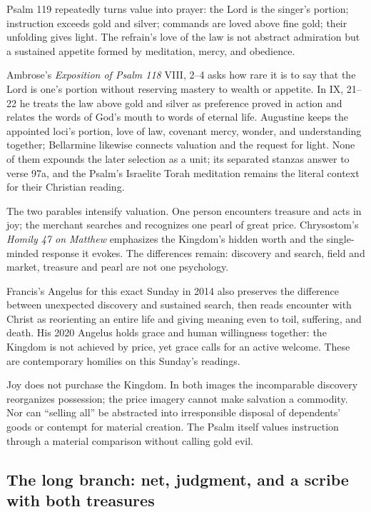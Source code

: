 Psalm 119 repeatedly turns value into prayer: the Lord is the singer's portion; instruction exceeds gold and silver; commands are loved above fine gold; their unfolding gives light. The refrain's love of the law is not abstract admiration but a sustained appetite formed by meditation, mercy, and obedience.

Ambrose's \emph{Exposition of Psalm 118} VIII, 2--4 asks how rare it is to say that the Lord is one's portion without reserving mastery to wealth or appetite. In IX, 21--22 he treats the law above gold and silver as preference proved in action and relates the words of God's mouth to words of eternal life. Augustine keeps the appointed loci's portion, love of law, covenant mercy, wonder, and understanding together; Bellarmine likewise connects valuation and the request for light. None of them expounds the later selection as a unit; its separated stanzas answer to verse 97a, and the Psalm's Israelite Torah meditation remains the literal context for their Christian reading.

The two parables intensify valuation. One person encounters treasure and acts in joy; the merchant searches and recognizes one pearl of great price. Chrysostom's \emph{Homily 47 on Matthew} emphasizes the Kingdom's hidden worth and the single-minded response it evokes. The differences remain: discovery and search, field and market, treasure and pearl are not one psychology.

Francis's Angelus for this exact Sunday in 2014 also preserves the difference between unexpected discovery and sustained search, then reads encounter with Christ as reorienting an entire life and giving meaning even to toil, suffering, and death. His 2020 Angelus holds grace and human willingness together: the Kingdom is not achieved by price, yet grace calls for an active welcome. These are contemporary homilies on this Sunday's readings.

Joy does not purchase the Kingdom. In both images the incomparable discovery reorganizes possession; the price imagery cannot make salvation a commodity. Nor can ``selling all'' be abstracted into irresponsible disposal of dependents' goods or contempt for material creation. The Psalm itself values instruction through a material comparison without calling gold evil.

\sectionguard
\subsection*{The long branch: net, judgment, and a scribe with both treasures\enspace{}}

